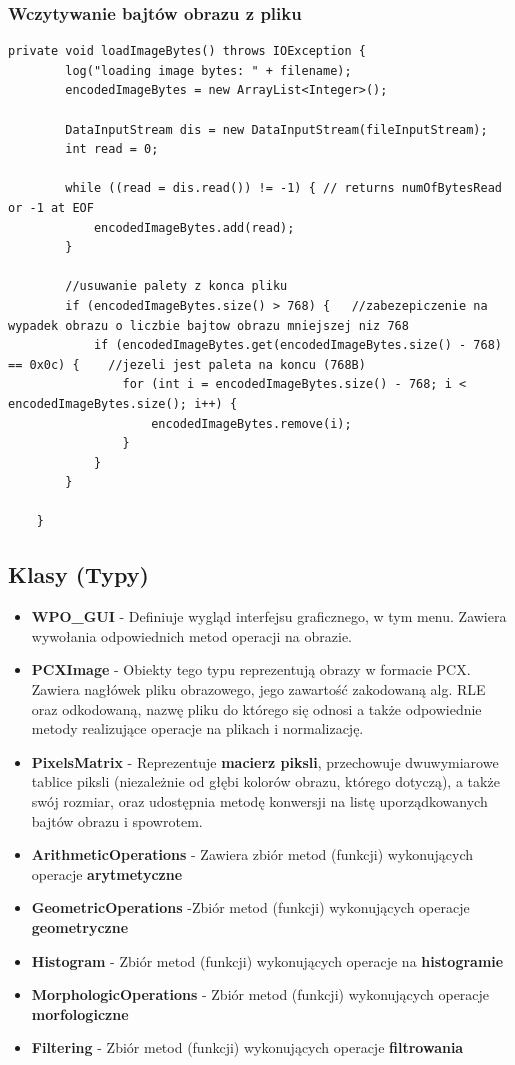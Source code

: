 \documentclass{article}
\begin{document}
\subsubsection{Wczytywanie bajtów obrazu z pliku}
\begin{verbatim}
private void loadImageBytes() throws IOException {
        log("loading image bytes: " + filename);
        encodedImageBytes = new ArrayList<Integer>();
        
        DataInputStream dis = new DataInputStream(fileInputStream);
        int read = 0;
        
        while ((read = dis.read()) != -1) { // returns numOfBytesRead or -1 at EOF
            encodedImageBytes.add(read);
        }

        //usuwanie palety z konca pliku 
        if (encodedImageBytes.size() > 768) {   //zabezepiczenie na wypadek obrazu o liczbie bajtow obrazu mniejszej niz 768
            if (encodedImageBytes.get(encodedImageBytes.size() - 768) == 0x0c) {    //jezeli jest paleta na koncu (768B)
                for (int i = encodedImageBytes.size() - 768; i < encodedImageBytes.size(); i++) {
                    encodedImageBytes.remove(i);
                }
            }
        }
        
    }
\end{verbatim}


\subsection{Klasy (Typy)}
\begin{itemize}
\item \textbf{WPO\_GUI} - Definiuje wygląd interfejsu graficznego, w tym menu. Zawiera wywołania odpowiednich metod operacji na obrazie.
\item \textbf{PCXImage} - Obiekty tego typu reprezentują obrazy w formacie PCX. Zawiera nagłówek pliku obrazowego, jego zawartość zakodowaną alg. RLE oraz odkodowaną, nazwę pliku do którego się odnosi a także odpowiednie metody realizujące operacje na plikach i normalizację.
\item \textbf{PixelsMatrix} - Reprezentuje \textbf{macierz piksli}, przechowuje dwuwymiarowe tablice piksli (niezależnie od głębi kolorów obrazu, którego dotyczą), a także swój rozmiar, oraz udostępnia metodę konwersji na listę uporządkowanych bajtów obrazu i spowrotem.
\item \textbf{ArithmeticOperations} - Zawiera zbiór metod (funkcji) wykonujących operacje \textbf{arytmetyczne}
\item \textbf{GeometricOperations} -Zbiór metod (funkcji) wykonujących operacje \textbf{geometryczne}
\item \textbf{Histogram} - Zbiór metod (funkcji) wykonujących operacje na \textbf{histogramie}
\item \textbf{MorphologicOperations} - Zbiór metod (funkcji) wykonujących operacje \textbf{morfologiczne}
\item \textbf{Filtering} - Zbiór metod (funkcji) wykonujących operacje \textbf{filtrowania}
\end{itemize}
\end{document}
